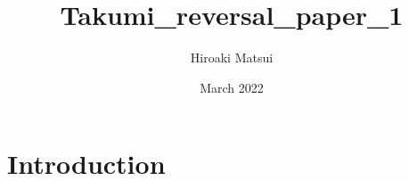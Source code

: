 \documentclass{article}
\title{Takumi_reversal_paper_1}
\author{Hiroaki Matsui}
\date{March 2022}
\begin{document}
\maketitle

\section{Introduction}
\end{document}
